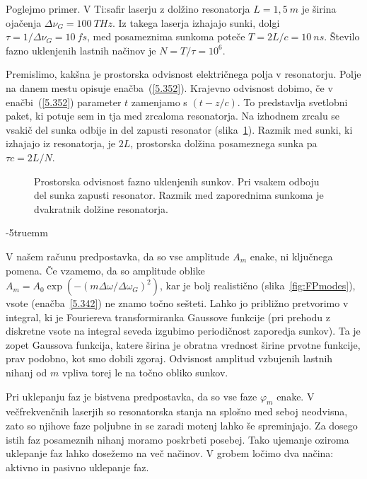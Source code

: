 Poglejmo primer. V Ti:safir laserju z dolžino resonatorja $L=1,5~\si{m}$ je 
širina ojačenja $\Delta \nu_G = 100~\si{THz}$. Iz takega laserja izhajajo
sunki, dolgi $\tau = 1/\Delta \nu_G = 10~\si{fs}$, med posameznima sunkoma 
poteče $T = 2L/c = 10~\si{ns}$. Število fazno uklenjenih lastnih načinov je 
$N = T/\tau = 10^6$.

Premislimo, kakšna je prostorska odvisnost električnega polja v
resonatorju. Polje na danem mestu opisuje enačba~(\ref{5.352}). Krajevno 
odvisnost dobimo, če v enačbi~(\ref{5.352}) parameter $t$ zamenjamo s $(t-z/c)$. To
predstavlja svetlobni paket, ki potuje sem in tja med zrcaloma
resonatorja. Na izhodnem zrcalu se vsakič del sunka odbije in del zapusti
resonator (slika~\ref{fig.5.11}). Razmik med sunki, ki izhajajo iz
resonatorja, je $2L$, prostorska dolžina posameznega sunka pa $\tau c=2L/N$.
\begin{figure}[h]
\centering
\def\svgwidth{120truemm} 

\caption{Prostorska odvisnost fazno uklenjenih sunkov. Pri vsakem odboju del
sunka zapusti resonator. Razmik med zaporednima sunkoma je dvakratnik dolžine resonatorja.}
\label{fig.5.11}
\end{figure}
\vglue-5truemm
\begin{remark}
V našem računu predpostavka, da so vse amplitude $A_{m}$ enake, ni ključnega 
pomena. Če vzamemo, da so amplitude oblike 
$A_{m}=A_{0}\exp (-(m\Delta \omega /\Delta \omega_{G})^{2})$, 
kar je bolj realistično (slika~\ref{fig:FPmodes}), vsote (enačba~\ref{5.342}) 
ne znamo točno sešteti. Lahko jo
približno pretvorimo v integral, ki je Fouriereva transformiranka Gaussove
funkcije (pri prehodu z diskretne vsote na integral seveda izgubimo
periodičnost zaporedja sunkov). Ta je zopet Gaussova funkcija, katere
širina je obratna vrednost širine prvotne funkcije, prav podobno, kot
smo dobili zgoraj. Odvisnost amplitud vzbujenih lastnih nihanj od $m$ 
vpliva torej le na točno obliko sunkov.
\end{remark}
\newpage
Pri uklepanju faz je bistvena predpostavka, da so vse faze $\varphi_m$ enake. 
V večfrekvenčnih laserjih so resonatorska stanja na splošno med seboj
neodvisna, zato so njihove faze poljubne in se zaradi motenj lahko še spreminjajo.
Za dosego istih faz posameznih nihanj moramo poskrbeti posebej. Tako ujemanje
oziroma uklepanje faz lahko dosežemo na več načinov. V grobem ločimo dva načina:
aktivno in pasivno uklepanje faz.

